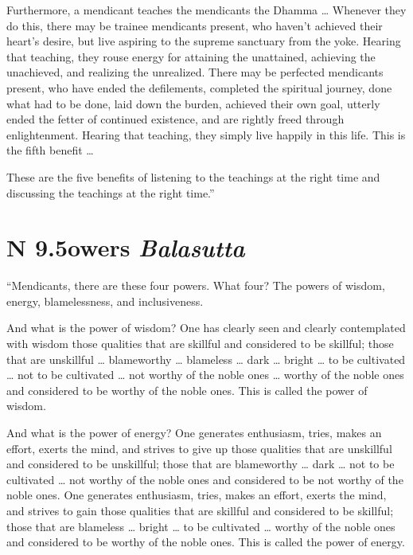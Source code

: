 \documentclass[12pt,openany]{book}%
\newcommand*{\suttatitleacronym}[1]{\smaller[2]{#1}\vspace*{.3em}}
\newcommand*{\suttatitletranslation}[1]{\linebreak{#1}}
\newcommand*{\suttatitleroot}[1]{\linebreak\smaller[2]\itshape{#1}}
\newcommand*{\tocacronym}[1]{\hspace*{-3.3em}{#1}\quad}
\newcommand*{\toctranslation}[1]{#1}
\newcommand*{\tocroot}[1]{(\textit{#1})}
\begin{document}
Furthermore, a mendicant teaches the mendicants the Dhamma … Whenever they do this, there may be trainee mendicants present, who haven’t achieved their heart’s desire, but live aspiring to the supreme sanctuary from the yoke. Hearing that teaching, they rouse energy for attaining the unattained, achieving the unachieved, and realizing the unrealized. There may be perfected mendicants present, who have ended the defilements, completed the spiritual journey, done what had to be done, laid down the burden, achieved their own goal, utterly ended the fetter of continued existence, and are rightly freed through enlightenment. Hearing that teaching, they simply live happily in this life. This is the fifth benefit … 

These are the five benefits of listening to the teachings at the right time and discussing the teachings at the right time.” 

%
\section*{{\suttatitleacronym AN 9.5}{\suttatitletranslation Powers }{\suttatitleroot Balasutta}}
\addcontentsline{toc}{section}{\tocacronym{AN 9.5} \toctranslation{Powers } \tocroot{Balasutta}}

“Mendicants, there are these four powers. What four? The powers of wisdom, energy, blamelessness, and inclusiveness. 

And what is the power of wisdom? One has clearly seen and clearly contemplated with wisdom those qualities that are skillful and considered to be skillful; those that are unskillful … blameworthy … blameless … dark … bright … to be cultivated … not to be cultivated … not worthy of the noble ones … worthy of the noble ones and considered to be worthy of the noble ones. This is called the power of wisdom. 

And what is the power of energy? One generates enthusiasm, tries, makes an effort, exerts the mind, and strives to give up those qualities that are unskillful and considered to be unskillful; those that are blameworthy … dark … not to be cultivated … not worthy of the noble ones and considered to be not worthy of the noble ones. One generates enthusiasm, tries, makes an effort, exerts the mind, and strives to gain those qualities that are skillful and considered to be skillful; those that are blameless … bright … to be cultivated … worthy of the noble ones and considered to be worthy of the noble ones. This is called the power of energy. 
\end{document}
